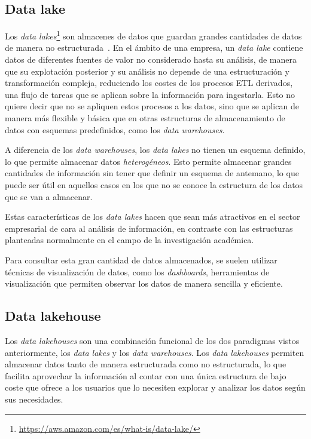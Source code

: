 \subsection{Data lake}\label{sec:lake}
Los \textit{data lakes}\footnote{
	\url{https://aws.amazon.com/es/what-is/data-lake/}
} son almacenes de datos que guardan grandes cantidades de datos de manera no
estructurada~\cite{mier2023dashboards}. En el ámbito de una empresa, un
\textit{data lake} contiene datos de diferentes fuentes de valor no considerado
hasta su análisis, de manera que su explotación posterior y su análisis no
depende de una estructuración y transformación compleja, reduciendo los costes
de los procesos ETL derivados, una flujo de tareas que se aplican sobre la
información para ingestarla. Esto no quiere decir que no se apliquen estos
procesos a los datos, sino que se aplican de manera más flexible y básica que en
otras estructuras de almacenamiento de datos con esquemas predefinidos, como los
\textit{data warehouses}.~\cite{pwint2018data}

A diferencia de los \textit{data warehouses}, los \textit{data lakes} no tienen
un esquema definido, lo que permite almacenar datos \textit{heterogéneos}. Esto
permite almacenar grandes cantidades de información sin tener que definir un
esquema de antemano, lo que puede ser útil en aquellos casos en los que no se
conoce la estructura de los datos que se van a almacenar.

Estas características de los \textit{data lakes} hacen que sean más atractivos
en el sector empresarial de cara al análisis de información, en contraste con
las estructuras planteadas normalmente en el campo de la investigación
académica.

Para consultar esta gran cantidad de datos almacenados, se suelen utilizar
técnicas de visualización de datos, como los \textit{dashboards}, herramientas
de visualización que permiten observar los datos de manera sencilla y eficiente.


\subsection{Data lakehouse}\label{sec:lakehouse}
Los \textit{data lakehouses} son una combinación funcional de los dos paradigmas
vistos anteriormente, los \textit{data lakes} y los \textit{data warehouses}.
Los \textit{data lakehouses} permiten almacenar datos tanto de manera
estructurada como no estructurada, lo que facilita aprovechar la información al
contar con una única estructura de bajo coste que ofrece a los usuarios que lo
necesiten explorar y analizar los datos según sus necesidades.


